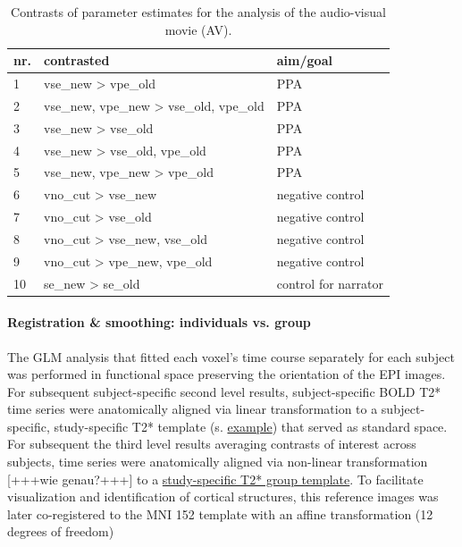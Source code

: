 \documentclass[english]{article}
\begin{document}
\begin{table}[t]
    \caption{Contrasts of parameter estimates for the analysis of the audio-visual movie (AV).}
\label{tab:av-contrasts}
\footnotesize
\begin{tabular}{lll}
\toprule
\textbf{nr.} &  \textbf{contrasted} & \textbf{aim/goal} \\
\midrule
1 & vse\_new > vpe\_old  & PPA \tabularnewline
2 & vse\_new, vpe\_new > vse\_old, vpe\_old & PPA \tabularnewline
3 & vse\_new > vse\_old & PPA \tabularnewline
4 & vse\_new > vse\_old, vpe\_old & PPA \tabularnewline
5 & vse\_new, vpe\_new > vpe\_old & PPA \tabularnewline
6 & vno\_cut > vse\_new & negative control \tabularnewline
7 & vno\_cut > vse\_old & negative control \tabularnewline
8 & vno\_cut > vse\_new, vse\_old & negative control \tabularnewline
9 & vno\_cut > vpe\_new, vpe\_old & negative control \tabularnewline
10 & se\_new > se\_old & control for narrator \tabularnewline
\end{tabular}
\end{table}


\paragraph{Registration \& smoothing: individuals vs. group}



The GLM analysis that fitted each voxel's time course separately for each
subject was performed in functional space preserving the orientation of the EPI
images. For subsequent subject-specific second level results, subject-specific
BOLD T2* time series were anatomically aligned via linear transformation to a
subject-specific, study-specific T2* template (s.
\href{"https://github.com/psychoinformatics-de/studyforrest-data-templatetransforms/blob/master/sub-01/bold3Tp2/brain.nii.gz"}{example})
that served as standard space.
For subsequent the third level results averaging contrasts of interest across
subjects, time series were anatomically aligned via non-linear transformation
[+++wie genau?+++] to a
\href{"https://github.com/psychoinformatics-de/studyforrest-data-templatetransforms/blob/master/templates/grpbold3Tp2/brain.nii.gz"}{study-specific
T2* group template}.
To facilitate visualization and identification of cortical structures, this
reference images was later co-registered to the MNI 152 template with an affine
transformation (12 degrees of freedom)
\end{document}
